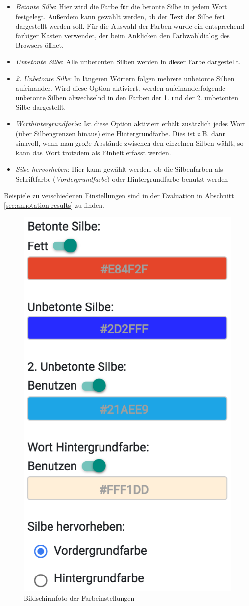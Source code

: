 \begin{itemize}
	\item \textit{Betonte Silbe}: Hier wird die Farbe für die betonte Silbe in jedem Wort festgelegt. Außerdem kann gewählt werden, ob der Text der Silbe fett dargestellt werden soll. Für die Auswahl der Farben wurde ein entsprechend farbiger Kasten verwendet, der beim Anklicken den Farbwahldialog des Browsers öffnet.
	
	\item \textit{Unbetonte Silbe}: Alle unbetonten Silben werden in dieser Farbe dargestellt.
	
	\item \textit{2. Unbetonte Silbe}: In längeren Wörtern folgen mehrere unbetonte Silben aufeinander. Wird diese Option aktiviert, werden aufeinanderfolgende unbetonte Silben abwechselnd in den Farben der 1. und der 2. unbetonten Silbe dargestellt.
	
	\item \textit{Worthintergrundfarbe}: Ist diese Option aktiviert erhält zusätzlich jedes Wort (über Silbengrenzen hinaus) eine Hintergrundfarbe. Dies ist z.B. dann sinnvoll, wenn man große Abstände zwischen den einzelnen Silben wählt, so kann das Wort trotzdem als Einheit erfasst werden.
	
	\item \textit{Silbe hervorheben}: Hier kann gewählt werden, ob die Silbenfarben als Schriftfarbe (\textit{Vordergrundfarbe}) oder Hintergrundfarbe benutzt werden
\end{itemize}

Beispiele zu verschiedenen Einstellungen sind in der Evaluation in Abschnitt \ref{sec:annotation-results} zu finden.

\begin{figure}[h!]
	\centering
	\includegraphics[width=.4\linewidth, frame]{figures/frontend/config-color}
	\caption{Bildschirmfoto der Farbeinstellungen}
	\label{fig:frontend-colorconf}
\end{figure}

